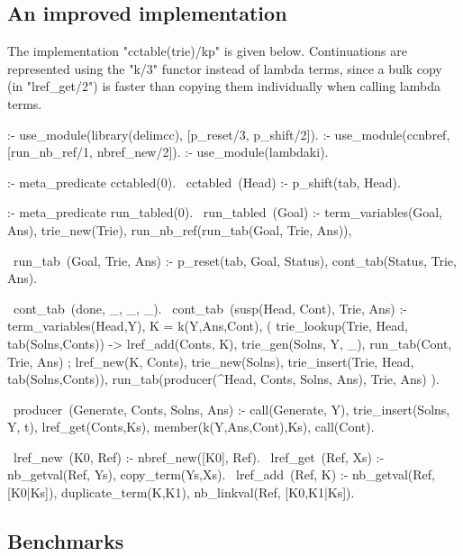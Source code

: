 \subsection{An improved implementation}

The implementation "cctable(trie)/kp" is given below. Continuations are represented using
the "k/3" functor instead of lambda terms, since a bulk copy (in "lref_get/2") is faster
than copying them individually when calling lambda terms. 
\begin{prolog-framed}[name=cctable_trie_kp,numbers=left]
  :- use_module(library(delimcc), [p_reset/3, p_shift/2]).
  :- use_module(ccnbref, [run_nb_ref/1, nbref_new/2]).
  :- use_module(lambdaki).
        
  :- meta_predicate cctabled(0). 
  ~cctabled~(Head) :- p_shift(tab, Head).

  :- meta_predicate run_tabled(0). 
  ~run_tabled~(Goal) :-
     term_variables(Goal, Ans), trie_new(Trie),
     run_nb_ref(run_tab(Goal, Trie, Ans)),

  ~run_tab~(Goal, Trie, Ans) :-
     p_reset(tab, Goal, Status),
     cont_tab(Status, Trie, Ans).

  ~cont_tab~(done, _, _, _).
  ~cont_tab~(susp(Head, Cont), Trie, Ans) :-  
     term_variables(Head,Y), K = k(Y,Ans,Cont),
     (  trie_lookup(Trie, Head, tab(Solns,Conts))
     -> lref_add(Conts, K),
        trie_gen(Solns, Y, _),
        run_tab(Cont, Trie, Ans)
     ;  lref_new(K, Conts), trie_new(Solns),
        trie_insert(Trie, Head, tab(Solns,Conts)),
        run_tab(producer(\Y^Head, Conts, Solns, Ans), Trie, Ans)
     ).

  ~producer~(Generate, Conts, Solns, Ans) :-
     call(Generate, Y),
     trie_insert(Solns, Y, t),
     lref_get(Conts,Ks), 
     member(k(Y,Ans,Cont),Ks), call(Cont).

  ~lref_new~(K0, Ref) :- nbref_new([K0], Ref).
  ~lref_get~(Ref, Xs) :- nb_getval(Ref, Ys), copy_term(Ys,Xs).
  ~lref_add~(Ref, K) :- 
    nb_getval(Ref, [K0|Ks]), duplicate_term(K,K1), 
    nb_linkval(Ref, [K0,K1|Ks]).
\end{prolog-framed}

\subsection{Benchmarks}

